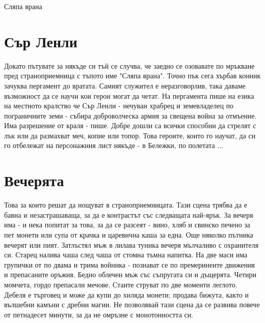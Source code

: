 \documentclass{article}
\newcommand{\directspeech}[1]{#1}  %
\begin{document}
Сляпа врана
\section{Сър Ленли}
\directspeech{Докато пътувате за някъде си тъй се случва, че заедно се озовавате по мръкване пред страноприемница с тъпото име "Сляпа врана". Точно пък сега хърбав конник зачуква пергамент до вратата.}
Самият служител е неразговорлив, така даваме възможност да се научи кои герои могат да четат.
На пергамента пише на езика на местното кралство че
\directspeech{Сър Ленли - нечуван храбрец и земевладелец по пограничните земи - събира доброволческа армия за свещена война за отмъение.
Има разрешение от краля - пише.
Добре дошли са всички способни да стрелят с лък или да размахват меч, копие или топор.}
Това героите, които го научат, да си го отбележат на персонажния лист някъде - в Бележки, по полетата ...

\section{Вечерята}
Това за които решат да нощуват в страноприемницата.
Тази сцена трябва да е бавна и незастрашаваща, за да е контрастът със следващата най-ярък.
За вечеря има - и нека попитат за това, за да се разсеят -
\directspeech{вино, хляб и свинско печено за пет монети или супа от крачка и царевична каша за една}.
Още няколко пътника вечерят или пият.
Затлъстял мъж в лилава туника вечеря мълчаливо с охранителя си.
Старец налива чаша след чаша от стомна тъмна напитка.
На две маси има групички от по двама и трима войника - познават се по премеринеите движения и препасаните оръжия.
Бедно облечен мъж със съпругата си и дъщерята.
Четири момчета, гордо препасали мечове.
Стаите струват по две моменти леглото.
Дебеля е търговец и може да купи до хиляда монети; продава бижута, както и вълшебни камъни с дребни магии.
Не позволявай тази сцена да се развива повече от петнадесет минути, за да не омръзне с монотонността си.
\end{document}
